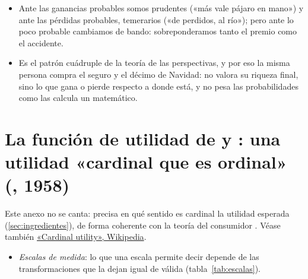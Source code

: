 \documentclass[11pt]{article}
\begin{document}
\begin{itemize}
\begin{itemize}
  \item Ante las ganancias probables somos prudentes («más vale pájaro en mano») y ante las pérdidas probables, temerarios («de perdidos, al río»); pero ante lo poco probable cambiamos de bando: sobreponderamos tanto el premio como el accidente.

  \item Es el patrón cuádruple de la teoría de las perspectivas, y por eso la misma persona compra el seguro y el décimo de Navidad: no valora su riqueza final, sino lo que gana o pierde respecto a donde está, y no pesa las probabilidades como las calcula un matemático.
  \end{itemize}
\end{itemize}

\clearpage
\appendix

\section{La función de utilidad de  y :\cortetitulo{} una utilidad «cardinal que es ordinal» (, 1958)}\label{anexo:cardinal}

Este anexo no se canta: precisa en qué sentido es cardinal la utilidad esperada (\ref{sec:ingredientes}), de forma coherente con la teoría del consumidor . Véase también \href{https://en.wikipedia.org/wiki/Cardinal_utility}{«Cardinal utility», Wikipedia}.

\begin{itemize}
\item \emph{Escalas de medida}\nocite{Stevens1946Theory}: lo que una escala permite decir depende de las transformaciones que la dejan igual de válida (tabla~\ref{tab:escalas}).
\end{itemize}
\end{document}
